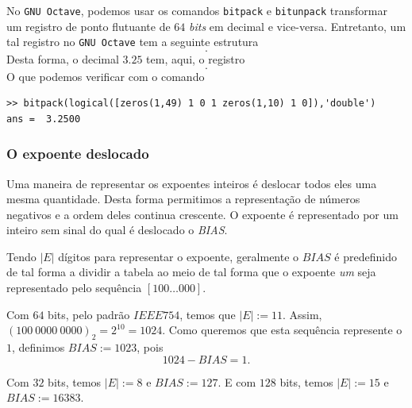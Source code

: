 \ifisoctave
\begin{obs}
  No \verb+GNU Octave+, podemos usar os comandos \verb+bitpack+ e \verb+bitunpack+ transformar um registro de ponto flutuante de $64$ \emph{bits} em decimal e vice-versa. Entretanto, um tal registro no \verb+GNU Octave+ tem a seguinte estrutura
  \begin{equation*}
    [m_{52}m_{51}m_{50}\ldots m_{1}|c_0c_1c_2\cdots c_{10}|s].
  \end{equation*}
Desta forma, o decimal $3.25$ tem, aqui, o registro
\begin{equation*}
  [000\ldots 0101|000\ldots 01|0].
\end{equation*}
O que podemos verificar com o comando
\begin{verbatim}
>> bitpack(logical([zeros(1,49) 1 0 1 zeros(1,10) 1 0]),'double')
ans =  3.2500
\end{verbatim}
\end{obs}
\fi

\subsubsection{O expoente deslocado}

Uma maneira de representar os expoentes inteiros é deslocar todos eles uma mesma quantidade. Desta forma permitimos a representação de números negativos e a ordem deles continua crescente. O expoente é representado por um inteiro sem sinal do qual é deslocado o \emph{BIAS}.

Tendo $|E|$ dígitos para representar o expoente, geralmente o $BIAS$ é predefinido de tal forma a dividir a tabela ao meio de tal forma que o expoente \textit{um} seja representado pelo sequência $[100\ldots 000]$.

\begin{ex}
  Com $64$ bits, pelo padrão $IEEE754$, temos que $|E|:=11$. Assim, $(100~0000~0000)_2=2^{10}=1024$. Como queremos que esta sequência represente o $1$, definimos $BIAS:=1023$, pois
  $$ 1024-BIAS=1.$$

  Com $32$ bits, temos $|E|:=8$ e $BIAS:=127$. E com $128$ bits, temos $|E|:=15$ e $BIAS:=16383$.
\end{ex}

